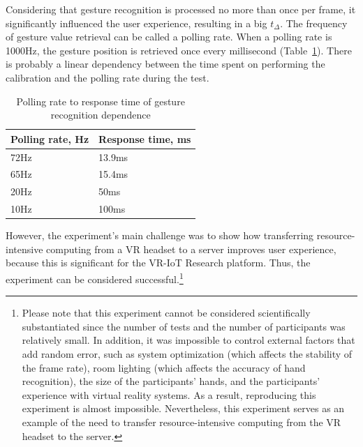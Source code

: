 Considering that gesture recognition is processed no more than once per frame, it significantly influenced the user experience, resulting in a big $t_{\Delta}$. The frequency of gesture value retrieval can be called a polling rate. When a polling rate is 1000Hz, the gesture position is retrieved once every millisecond (Table~\ref{tab:polling-rate-table}). There is probably a linear dependency between the time spent on performing the calibration and the polling rate during the test.

\begin{table}
  \centering
  \begin{threeparttable}[c]
    \caption{Polling rate to response time of gesture recognition dependence}
    \label{tab:polling-rate-table}
    \begin{tabular}{ll}
      \toprule
      Polling rate, Hz    & Response time, ms                 \\
      \midrule
      72Hz & 13.9ms \\
      65Hz & 15.4ms \\
      20Hz & 50ms \\
      10Hz & 100ms \\
      \bottomrule
    \end{tabular}
  \end{threeparttable}
\end{table}

However, the experiment's main challenge was to show how transferring resource-intensive computing from a VR headset to a server improves user experience, because this is significant for the VR-IoT Research platform. Thus, the experiment can be considered successful.\footnote{Please note that this experiment cannot be considered scientifically substantiated since the number of tests and the number of participants was relatively small. In addition, it was impossible to control external factors that add random error, such as system optimization (which affects the stability of the frame rate), room lighting (which affects the accuracy of hand recognition), the size of the participants' hands, and the participants' experience with virtual reality systems. As a result, reproducing this experiment is almost impossible. Nevertheless, this experiment serves as an example of the need to transfer resource-intensive computing from the VR headset to the server.
}


